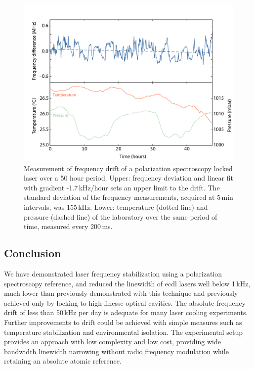 \begin{figure}[htbp]
\centering
\includegraphics[width=\linewidth]{chapter1/Figs/fig6_v1.pdf}
\caption{Measurement of frequency drift of a polarization spectroscopy locked laser over a 50 hour period. Upper: frequency deviation and linear fit with gradient -1.7\,kHz/hour sets an upper limit to the drift. The standard deviation of the frequency measurements, acquired at 5\,min intervals, was 155\,kHz. Lower: temperature (dotted line) and pressure (dashed line) of the laboratory over the same period of time, measured every 200\,ms.}
\label{drift}
\end{figure}

\subsection{Conclusion}

We have demonstrated laser frequency stabilization using a polarization spectroscopy reference, and reduced the linewidth of \gls*{ecdl} lasers well below 1\,kHz, much lower than previously demonstrated with this technique and previously achieved only by locking to high-finesse optical cavities. The absolute frequency drift of less than 50\,kHz per day is adequate for many laser cooling experiments.  Further improvements to drift could be achieved with simple measures such as temperature stabilization and environmental isolation. The experimental setup provides an approach with low complexity and low cost, providing wide bandwidth linewidth narrowing without radio frequency modulation while retaining an absolute atomic reference.

